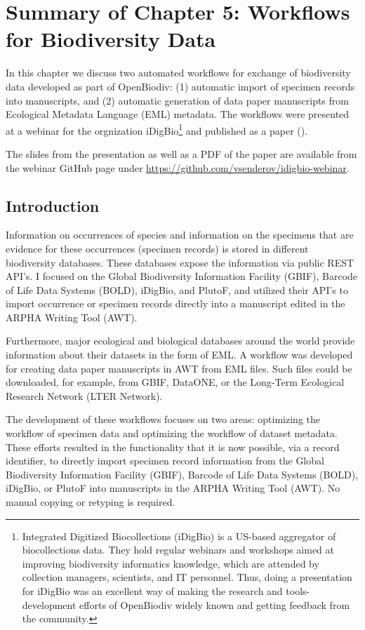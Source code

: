 \chapter{Summary of Chapter 5: Workflows for Biodiversity Data}
\label{chapter-case-study}

In this chapter we discuss two automated workflows for exchange of biodiversity data developed as part of OpenBiodiv: (1) automatic import of specimen records into manuscripts, and (2) automatic generation of data paper manuscripts from Ecological Metadata Language (EML) metadata. The workflows were presented at a webinar for the orgnization iDigBio\footnote{Integrated Digitized Biocollections (iDigBio) is a US-based aggregator of biocollections data. They hold regular webinars and workshops aimed at improving biodiversity informatics knowledge, which are attended by collection managers, scientists, and IT personnel. Thus, doing a presentation for iDigBio was an excellent way of making the research and tools-development efforts of OpenBiodiv widely known and getting feedback from the community.} and published as a paper (\cite{senderov_online_2016}).

The slides from the presentation as well as a PDF of the paper are available from the webinar GitHub page under \url{https://github.com/vsenderov/idigbio-webinar}.

\section{Introduction}

Information on occurrences of species and information on the specimens that are evidence for these occurrences (specimen records) is stored in different biodiversity databases. These databases expose the information via public REST API's. I focused on the Global Biodiversity Information Facility (GBIF), Barcode of Life Data Systems (BOLD), iDigBio, and PlutoF, and utilized their API's to import occurrence or specimen records directly into a manuscript edited in the ARPHA Writing Tool (AWT).

Furthermore, major ecological and biological databases around the world provide information about their datasets in the form of EML. A workflow was developed for creating data paper manuscripts in AWT from EML files. Such files could be downloaded, for example, from GBIF, DataONE, or the Long-Term Ecological Research Network (LTER Network).

The development of these workflows focuses on two areas: optimizing the workflow of specimen data and optimizing the workflow of dataset metadata. These efforts resulted in the functionality that it is now possible, via a record identifier, to directly import specimen record information from the Global Biodiversity Information Facility (GBIF), Barcode of Life Data Systems (BOLD), iDigBio, or PlutoF into manuscripts in the ARPHA Writing Tool (AWT). No manual copying or retyping is required. 

